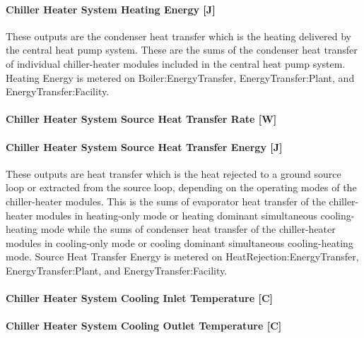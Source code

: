 \paragraph{Chiller Heater System Heating Energy {[}J{]}}\label{chiller-heater-system-heating-energy-j}

These outputs are the condenser heat transfer which is the heating delivered by the central heat pump system. These are the sums of the condenser heat transfer of individual chiller-heater modules included in the central heat pump system. Heating Energy is metered on Boiler:EnergyTransfer, EnergyTransfer:Plant, and EnergyTransfer:Facility.

\paragraph{Chiller Heater System Source Heat Transfer Rate {[}W{]}}\label{chiller-heater-system-source-heat-transfer-rate-w}

\paragraph{Chiller Heater System Source Heat Transfer Energy {[}J{]}}\label{chiller-heater-system-source-heat-transfer-energy-j}

These outputs are heat transfer which is the heat rejected to a ground source loop or extracted from the source loop, depending on the operating modes of the chiller-heater modules. This is the sums of evaporator heat transfer of the chiller-heater modules in heating-only mode or heating dominant simultaneous cooling-heating mode while the sums of condenser heat transfer of the chiller-heater modules in cooling-only mode or cooling dominant simultaneous cooling-heating mode. Source Heat Transfer Energy is metered on HeatRejection:EnergyTransfer, EnergyTransfer:Plant, and EnergyTransfer:Facility.

\paragraph{Chiller Heater System Cooling Inlet Temperature {[}C{]}}\label{chiller-heater-system-cooling-inlet-temperature-c}

\paragraph{Chiller Heater System Cooling Outlet Temperature {[}C{]}}\label{chiller-heater-system-cooling-outlet-temperature-c}

